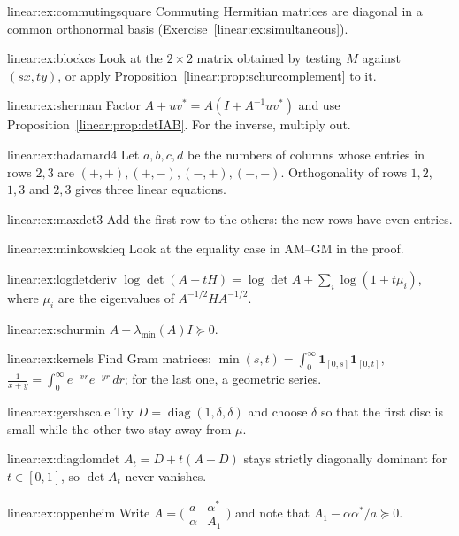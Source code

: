 \begin{hint}{linear:ex:commutingsquare}
Commuting Hermitian matrices are diagonal in a common orthonormal basis (Exercise~\ref{linear:ex:simultaneous}).
\end{hint}
\begin{hint}{linear:ex:blockcs}
Look at the $2\times2$ matrix obtained by testing $M$ against $(sx,ty)$, or apply Proposition~\ref{linear:prop:schurcomplement} to it.
\end{hint}
\begin{hint}{linear:ex:sherman}
Factor $A+uv^*=A(I+A^{-1}uv^*)$ and use Proposition~\ref{linear:prop:detIAB}. For the inverse, multiply out.
\end{hint}
\begin{hint}{linear:ex:hadamard4}
Let $a,b,c,d$ be the numbers of columns whose entries in rows $2,3$ are $(+,+),(+,-),(-,+),(-,-)$. Orthogonality of rows $1,2$, $1,3$ and
$2,3$ gives three linear equations.
\end{hint}
\begin{hint}{linear:ex:maxdet3}
Add the first row to the others: the new rows have even entries.
\end{hint}
\begin{hint}{linear:ex:minkowskieq}
Look at the equality case in AM--GM in the proof.
\end{hint}
\begin{hint}{linear:ex:logdetderiv}
$\log\det(A+tH)=\log\det A+\sum_i\log(1+t\mu_i)$, where $\mu_i$ are the eigenvalues of $A^{-1/2}HA^{-1/2}$.
\end{hint}
\begin{hint}{linear:ex:schurmin}
$A-\lambda_{\min}(A)I\succeq0$.
\end{hint}
\begin{hint}{linear:ex:kernels}
Find Gram matrices: $\min(s,t)=\int_0^\infty\mathbf 1_{[0,s]}\mathbf 1_{[0,t]}$, $\frac1{x+y}=\int_0^\infty e^{-xr}e^{-yr}\,dr$; for the last one,
a geometric series.
\end{hint}
\begin{hint}{linear:ex:gershscale}
Try $D=\operatorname{diag}(1,\delta,\delta)$ and choose $\delta$ so that the first disc is small while the other two stay away from $\mu$.
\end{hint}
\begin{hint}{linear:ex:diagdomdet}
$A_t=D+t(A-D)$ stays strictly diagonally dominant for $t\in[0,1]$, so $\det A_t$ never vanishes.
\end{hint}
\begin{hint}{linear:ex:oppenheim}
Write $A=\bigl(\begin{smallmatrix}a&\alpha^*\\\alpha&A_1\end{smallmatrix}\bigr)$ and note that $A_1-\alpha\alpha^*/a\succeq0$.
\end{hint}

